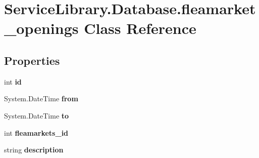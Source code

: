 \hypertarget{class_service_library_1_1_database_1_1fleamarket__openings}{\section{Service\-Library.\-Database.\-fleamarket\-\_\-openings Class Reference}
\label{class_service_library_1_1_database_1_1fleamarket__openings}
}
\subsection*{Properties}
\begin{DoxyCompactItemize}
\item 
\hypertarget{class_service_library_1_1_database_1_1fleamarket__openings_a68f0fb19119daba13ad2bd0d17155fcb}{int {\bfseries id}}\label{class_service_library_1_1_database_1_1fleamarket__openings_a68f0fb19119daba13ad2bd0d17155fcb}

\item 
\hypertarget{class_service_library_1_1_database_1_1fleamarket__openings_a9995107aab65b60e7bed709246450828}{System.\-Date\-Time {\bfseries from}}\label{class_service_library_1_1_database_1_1fleamarket__openings_a9995107aab65b60e7bed709246450828}

\item 
\hypertarget{class_service_library_1_1_database_1_1fleamarket__openings_a58b2a047a2f688ba8f8674df0bee7b56}{System.\-Date\-Time {\bfseries to}}\label{class_service_library_1_1_database_1_1fleamarket__openings_a58b2a047a2f688ba8f8674df0bee7b56}

\item 
\hypertarget{class_service_library_1_1_database_1_1fleamarket__openings_a0d643bff256d4a1af4a90799f4f58f21}{int {\bfseries fleamarkets\-\_\-id}}\label{class_service_library_1_1_database_1_1fleamarket__openings_a0d643bff256d4a1af4a90799f4f58f21}

\item 
\hypertarget{class_service_library_1_1_database_1_1fleamarket__openings_a7f8f71660f7189995743d9cd968081f5}{string {\bfseries description}}\label{class_service_library_1_1_database_1_1fleamarket__openings_a7f8f71660f7189995743d9cd968081f5}


\end{DoxyCompactItemize}
